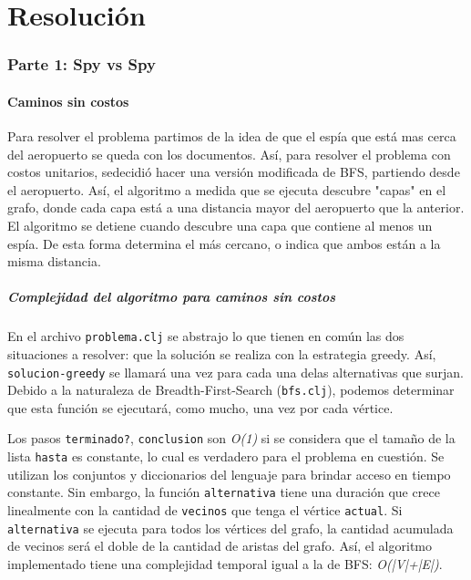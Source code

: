 \documentclass{article}
\begin{document}
\part{Resolución}
\section{Parte 1: Spy vs Spy}

\subsection{Caminos sin costos}
Para resolver el problema partimos de la idea de que el espía que está mas cerca del aeropuerto se queda con los documentos. Así, para resolver el problema con costos unitarios, sedecidió hacer una versión modificada de BFS, partiendo desde el aeropuerto. Así, el algoritmo a medida que se ejecuta descubre "capas" en el grafo, donde cada capa está a una distancia mayor del aeropuerto que la anterior. El algoritmo se detiene cuando descubre una capa que contiene al menos un espía. De esta forma determina el más cercano, o indica que ambos están a la misma distancia.

\subsubsection{Complejidad del algoritmo para caminos sin costos}

En el archivo \texttt{problema.clj} se abstrajo lo que tienen en común las dos situaciones a resolver: que la solución se realiza con la estrategia greedy. Así, \texttt{solucion-greedy} se llamará una vez para cada una delas alternativas que surjan. Debido a la naturaleza de Breadth-First-Search (\texttt{bfs.clj}), podemos determinar que esta función se ejecutará, como mucho, una vez por cada vértice.

Los pasos \texttt{terminado?}, \texttt{conclusion} son \textit{O(1)} si se considera que el tamaño de la lista \texttt{hasta} es constante, lo cual es verdadero para el problema en cuestión. Se utilizan los conjuntos y diccionarios del lenguaje para brindar acceso en tiempo constante. Sin embargo, la función \texttt{alternativa} tiene una duración que crece linealmente con la cantidad de \texttt{vecinos} que tenga el vértice \texttt{actual}. Si \texttt{alternativa} se ejecuta para todos los vértices del grafo, la cantidad acumulada de vecinos será el doble de la cantidad de aristas del grafo. Así, el algoritmo implementado tiene una complejidad temporal igual a la de BFS: \textit{O(|V|+|E|)}.
\end{document}
